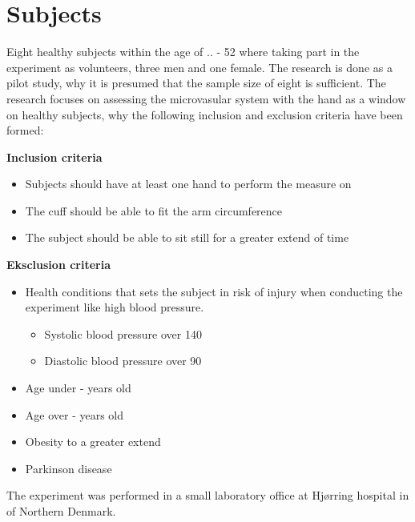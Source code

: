 \section{Subjects}

Eight healthy subjects within the age of .. - 52 where taking part in the experiment as volunteers, three men and one female. The research is done as a pilot study, why it is presumed that the sample size of eight is sufficient. The research focuses on assessing the microvasular system with the hand as a window on healthy subjects, why the following inclusion and exclusion criteria have been formed:

\textbf{Inclusion criteria}
\begin{itemize}[noitemsep]
	\item Subjects should have at least one hand to perform the measure on
	\item The cuff should be able to fit the arm circumference 
	\item The subject should be able to sit still for a greater extend of time
\end{itemize}

\textbf{Eksclusion criteria}
\begin{itemize}[noitemsep]
	\item Health conditions that sets the subject in risk of injury when conducting the experiment like high blood pressure.
	\begin{itemize}
		\item Systolic blood pressure over 140
		\item Diastolic blood pressure over 90
	\end{itemize}	
	\item Age under - years old
	\item Age over - years old
	\item Obesity to a greater extend
	\item Parkinson disease  
\end{itemize} 

The experiment was performed in a small laboratory office at Hjørring hospital in of Northern Denmark. 